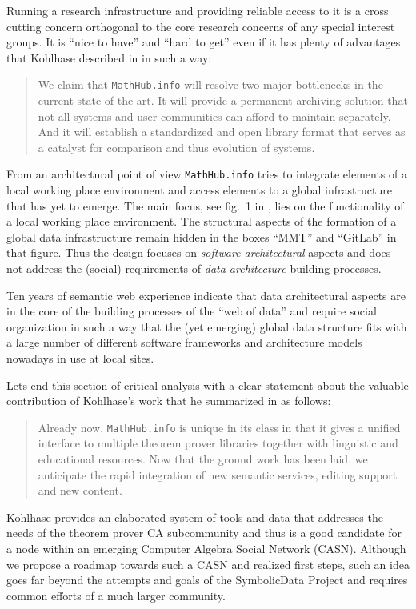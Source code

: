\documentclass{llncs}
\newcommand{\SD}{{\sc Symbo\-lic\-Data}}
\begin{document}
Running a research infrastructure and providing reliable access to it is a
cross cutting concern \cite{ccc} orthogonal to the core research concerns of
any special interest groups. It is ``nice to have'' and ``hard to get'' even
if it has plenty of advantages that Kohlhase described in \cite{mathhub} in
such a way:
\begin{quote}
  We claim that \texttt{MathHub.info} will resolve two major bottlenecks in the
  current state of the art. It will provide a permanent archiving solution that
  not all systems and user communities can afford to maintain separately. And
  it will establish a standardized and open library format that serves as a
  catalyst for comparison and thus evolution of systems.
\end{quote}
From an architectural point of view \texttt{MathHub.info} tries to integrate
elements of a local working place environment and access elements to a global
infrastructure that has yet to emerge. The main focus, see fig.~1 in
\cite{mathhub}, lies on the functionality of a local working place
environment.  The structural aspects of the formation of a global data
infrastructure remain hidden in the boxes ``MMT'' and ``GitLab'' in that
figure. Thus the design focuses on \emph{software architectural} aspects and
does not address the (social) requirements of \emph{data architecture}
building processes.

Ten years of semantic web experience indicate that data architectural aspects
are in the core of the building processes of the ``web of data'' and require
social organization in such a way that the (yet emerging) global data
structure fits with a large number of different software frameworks and
architecture models nowadays in use at local sites.

Lets end this section of critical analysis with a clear statement about the
valuable contribution of Kohlhase's work that he summarized in \cite{mathhub}
as follows:
\begin{quote}
  Already now, \texttt{MathHub.info} is unique in its class in that it gives a
  unified interface to multiple theorem prover libraries together with
  linguistic and educational resources. Now that the ground work has been laid,
  we anticipate the rapid integration of new semantic services, editing support
  and new content.
\end{quote}
Kohlhase provides an elaborated system of tools and data that addresses the
needs of the theorem prover CA subcommunity and thus is a good candidate for a
node within an emerging Computer Algebra Social Network (CASN). Although we
propose a roadmap towards such a CASN and realized first steps, such an idea
goes far beyond the attempts and goals of the {\SD} Project and requires
common efforts of a much larger community.
\end{document}
